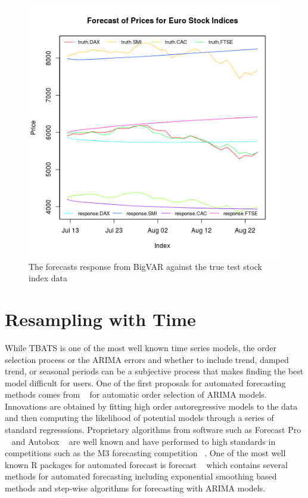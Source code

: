 \documentclass[12pt]{article}\usepackage[]{graphicx}\usepackage[]{color}
\theoremstyle{definition}
\let\proglang=\textsf
\newcommand{\pkg}[1]{{\fontseries{b}\selectfont #1}}
\begin{document}
\begin{figure}[H]
\includegraphics[width=\linewidth]{plot_bigvar_train.png}
\centering
\caption{The forecasts response from BigVAR against the true test stock index data}
\label{fig:bigvar_train}
\end{figure}
\doublespacing

\section{Resampling with Time}
\label{sec:resamp}
While TBATS is one of the most well known time series models, the order selection process or the ARIMA errors and whether to include trend, damped trend, or seasonal periods can be a subjective process that makes finding the best model difficult for users. One of the first proposals for automated forecasting methods comes from ~\cite{hannanOrder} for automatic order selection of ARIMA models. Innovations are obtained by fitting high order autoregressive models to the data and then computing the likelihood of potential models through a series of standard regresssions. Proprietary algorithms from software such as \proglang{Forecast Pro} ~\cite{forecastpro} and \proglang{Autobox} ~\cite{reillyautobox} are well known and have performed to high standards in competitions such as the M3 forecasting competition ~\cite{Makridakis2000451}. One of the most well known R packages for automated forecast is \pkg{forecast} ~\cite{HyndForecast} which contains several methods for automated forecasting including exponential smoothing based methods and step-wise algorithms for forecasting with ARIMA models.
\end{document}
